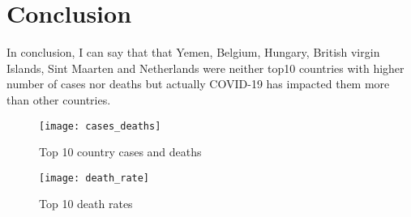 \documentclass[12pt, letterpaper]{article}
\begin{document}
\section{Conclusion }

In conclusion, I can say that that Yemen, Belgium, Hungary, British virgin Islands, Sint Maarten and Netherlands were neither top10 countries with higher number of cases nor deaths but actually COVID-19 has impacted them more than other countries.  

 \begin{figure}[h]
    \centering
    \texttt{[image: cases\_deaths]}
    \caption{Top 10 country cases and deaths}
    \label{fig: cases_deaths}
\end{figure}


\begin{figure}[h]
    \centering
    \texttt{[image: death\_rate]}
    \caption{Top 10 death rates}
    \label{fig: death_rate}
\end{figure}
\end{document}
